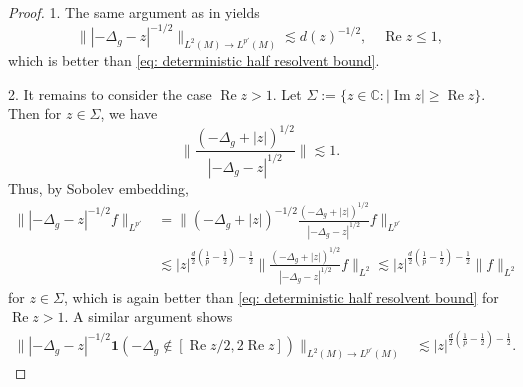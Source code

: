 \documentclass[12pt,reqno]{amsart}
\theoremstyle{definition}
\theoremstyle{remark}
\numberwithin{equation}{section}
\newcommand{\1}{\mathbbm{1}}
\newcommand{\C}{\mathbb{C}}
\DeclareMathOperator{\im}{Im}
\DeclareMathOperator{\re}{Re}
\begin{document}
\begin{proof} 
  1. The same argument as in \cite[Lemma 2.3]{Cuenin2026} yields
  \[
    \||-\Delta_g-z|^{-1/2}\|_{L^{2}(M)\to L^{p'}(M)}
    \lesssim d(z)^{-1/2},\quad \re z\leq 1,
  \]
  which is better than \eqref{eq: deterministic half resolvent bound}.

  2. It remains to consider the case $\re z>1$.
  Let $\Sigma:=\{z\in\C:|\im z|\geq \re z\}$. Then for $z\in \Sigma$, we have 
  \[
    \Big\|\frac{(-\Delta_g+|z|)^{1/2}}{|-\Delta_g-z|^{1/2}}\Big\|\lesssim 1.
  \]
  Thus, by Sobolev embedding,
  \begin{align*}
    \||-\Delta_g-z|^{-1/2}f\|_{L^{p'}}
    &=\|(-\Delta_g+|z|)^{-1/2}\frac{(-\Delta_g+|z|)^{1/2}}{|-\Delta_g-z|^{1/2}}f\|_{L^{p'}}\\
    & \lesssim |z|^{\frac{d}{2}(\frac{1}{p}-\frac{1}{2})-\frac{1}{2}}\|\frac{(-\Delta_g+|z|)^{1/2}}{|-\Delta_g-z|^{1/2}}f\|_{L^2}
\lesssim |z|^{\frac{d}{2}(\frac{1}{p}-\frac{1}{2})-\frac{1}{2}}\|f\|_{L^2}
  \end{align*}
for $z\in \Sigma$, which is again better than \eqref{eq: deterministic half resolvent bound} for $\re z>1$. A similar argument shows
  \begin{align*}
    \||-\Delta_g-z|^{-1/2}\mathbf{1}(-\Delta_g\notin[\re z/2,2\re z])\|_{L^{2}(M)\to L^{p'}(M)}
    & \lesssim|z|^{\frac{d}{2}(\frac{1}{p}-\frac{1}{2})-\frac{1}{2}}.
  \end{align*}


\end{proof}
\end{document}
